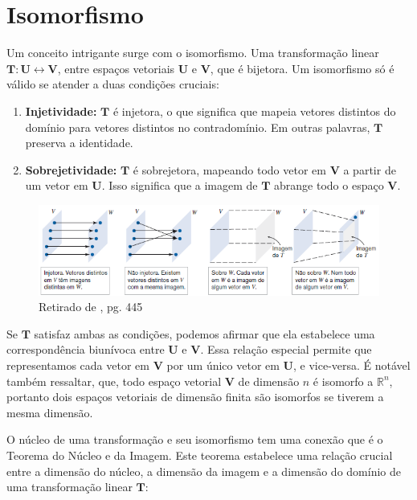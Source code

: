 \section{Isomorfismo}
Um conceito intrigante surge com o isomorfismo. Uma transformação linear $\mathbf{T}: \mathbf{U} \longleftrightarrow \mathbf{V}$, entre espaços vetoriais $\mathbf{U}$ e $\mathbf{V}$, que é bijetora. Um isomorfismo só é válido se atender a duas condições cruciais:

\begin{enumerate}
	\item \textbf{Injetividade:} $\mathbf{T}$ é injetora, o que significa que mapeia vetores distintos do domínio para vetores distintos no contradomínio. Em outras palavras, $\mathbf{T}$ preserva a identidade.
	\item \textbf{Sobrejetividade:} $\mathbf{T}$ é sobrejetora, mapeando todo vetor em $\mathbf{V}$ a partir de um vetor em $\mathbf{U}$. Isso significa que a imagem de $\mathbf{T}$ abrange todo o espaço $\mathbf{V}$.
\end{enumerate}

\begin{figure}[H]
	\centering
	\includegraphics[scale=1.00]{t_isomorfismo.png}
	\caption{Retirado de \cite{anton2010elementary}, pg. 445}
\end{figure}

Se $\mathbf{T}$ satisfaz ambas as condições, podemos afirmar que ela estabelece uma correspondência biunívoca entre $\mathbf{U}$ e $\mathbf{V}$. Essa relação especial permite que representamos cada vetor em $\mathbf{V}$  por um único vetor em $\mathbf{U}$, e vice-versa. É notável também ressaltar, que, todo espaço vetorial $\mathbf{V}$ de dimensão $n$ é isomorfo a $\mathbb{R}^n$, portanto dois espaços vetoriais de dimensão finita são isomorfos se tiverem a mesma dimensão.

O núcleo de uma transformação e seu isomorfismo tem uma conexão que é o Teorema do Núcleo e da Imagem. Este teorema estabelece uma relação crucial entre a dimensão do núcleo, a dimensão da imagem e a dimensão do domínio de uma transformação linear $\mathbf{T}$:

